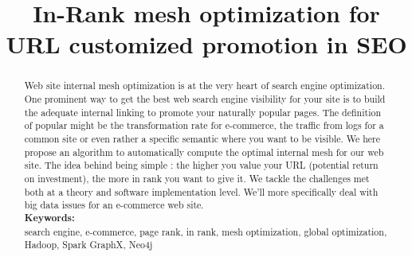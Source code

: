 \documentclass{iSWAGArticle}
\title{In-Rank mesh optimization for URL customized promotion in SEO}
\author{\iSWAGAuthor{Stefan Duprey\\
Cdiscount\\
stefan.duprey@cdiscount.com} \and \iSWAGAuthor{Fabien Jaunas\\
Cdiscount\\
fabien.jaunas@cdiscount.com}}
\begin{document}
\maketitle
\begin{abstract}
 Web site internal mesh optimization is at the very heart of search engine optimization. 
 One prominent way to get the best web search engine visibility for your site 
 is to build the adequate internal linking to promote your naturally popular pages. 
 The definition of popular might be the transformation rate for e-commerce, 
 the traffic from logs for a common site or even rather a specific semantic where you want to be visible. 
 We here propose an algorithm to automatically compute the optimal internal mesh for our web site. The idea
 behind being simple : the higher you value your URL (potential return on investment), the more in rank you want to give it.
 We tackle the challenges met both at a theory and software implementation level. 
 We'll more specifically deal with big data issues for an e-commerce web site.
 \\\newline
 \indent \textbf{Keywords: }
 \\\newline
search engine, e-commerce, page rank, in rank, mesh optimization, global optimization, Hadoop, Spark GraphX, Neo4j
\end{abstract}
\end{document}
